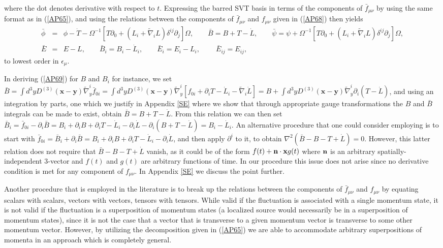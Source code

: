 \documentclass[aps]{revtex4}
\begin{document}
%
where the dot denotes derivative with respect to $t$. Expressing the barred SVT basis in terms of the components of $\bar{f}_{\mu\nu}$ by using the same format as in (\ref{AP65}), and using the relations between the components of $\bar{f}_{\mu\nu}$ and $f_{\mu\nu}$ given in (\ref{AP68}) then yields
%
\begin{eqnarray}
\bar{\phi}&=&\phi-\dot{T}-\Omega^{-1}[T\partial_0+(L_i+\tilde{\nabla}_iL)\delta^{ij}\partial_j]\Omega,\qquad \bar{B}=B+T-\dot{L},\qquad \bar{\psi}=\psi+\Omega^{-1}[T\partial_0+(L_i+\tilde{\nabla}_iL)\delta^{ij}\partial_j]\Omega,
\nonumber\\
\bar{E}&=&E-L,\qquad \bar{B}_i=B_i-\dot{L}_i,\qquad \bar{E}_i=E_i-L_i,\ \qquad \bar{E}_{ij}=E_{ij},
\label{AP69}
\end{eqnarray}
%
to lowest order in $\epsilon_{\mu}$. 

In deriving (\ref{AP69}) for $B$ and $B_i$ for instance, we set $\bar{B}=\int d^3yD^{(3)}(\mathbf{x}-\mathbf{y})\tilde{\nabla}_y^i\bar{f}_{0i}=\int d^3yD^{(3)}(\mathbf{x}-\mathbf{y})\tilde{\nabla}_y^i[f_{0i}+\partial_iT-\dot{L}_i-\tilde{\nabla}_i\dot{L}]=B+\int d^3yD^{(3)}(\mathbf{x}-\mathbf{y})\tilde{\nabla}_y^i\partial_i(T-\dot{L})$, and using an integration by parts, one which we justify in Appendix \ref{SE} where we show that through appropriate gauge transformations the $B$ and $\bar{B}$ integrals can be made to exist, obtain $\bar{B}=B+T-\dot{L}$. From this relation we can then set $\bar{B}_i=\bar{f}_{0i}-\partial_i\bar{B}=B_i+\partial_iB+\partial_iT-\dot{L}_i-\partial_i\dot{L}-\partial_i(B+T-\dot{L})=B_i-\dot{L}_i$. An alternative procedure that one could consider employing is to start with $\bar{f}_{0i}=\bar{B}_i+\partial_i\bar{B}=B_i+\partial_iB+\partial_iT-\dot{L}_i-\partial_i\dot{L}$, and then apply $\partial^i$ to it, to  obtain $\nabla^2(\bar{B}-B-T+\dot{L})=0$. However, this latter relation  does not require that $\bar{B}-B-T+\dot{L}$ vanish, as it could be of the form $f(t)+{\bf n}\cdot {\bf x} g(t)$ where ${\bf n}$ is an arbitrary spatially-independent 3-vector and $f(t)$ and $g(t)$ are arbitrary functions of time. In our procedure this issue does not arise since no derivative condition is met for any component of $f_{\mu\nu}$. In Appendix  \ref{SE} we discuss the point further. 

Another procedure that is employed in the literature is to break up the relations between the components of $\bar{f}_{\mu\nu}$ and $f_{\mu\nu}$ by equating scalars with scalars, vectors with vectors, tensors with tensors. While valid if the fluctuation is associated with a single momentum state, it is not valid if the fluctuation is a superposition of momentum states (a localized source would necessarily be in a superposition of momentum states), since it is not the case that a vector that is transverse to a given momentum vector is transverse to some other momentum vector. However, by utilizing the decomposition given in (\ref{AP65}) we are able to accommodate arbitrary superpositions of momenta in an approach which is completely general. 
\end{document}
